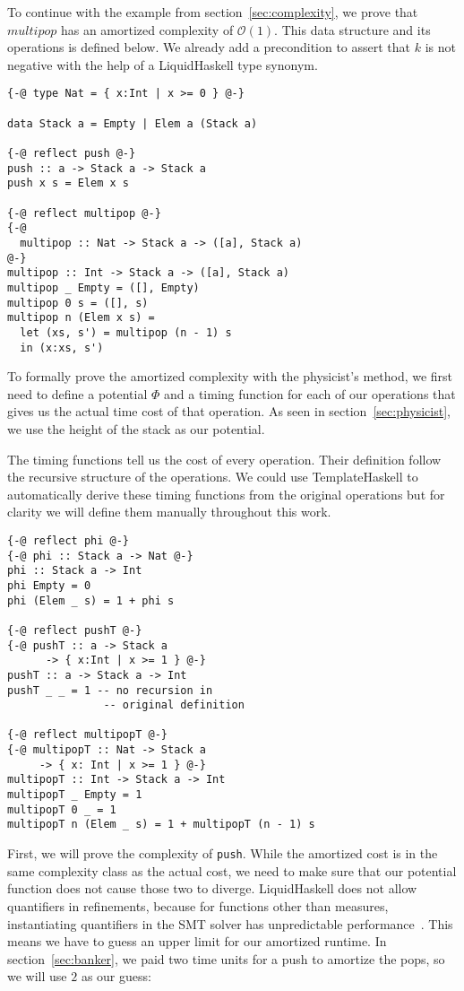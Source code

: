 \documentclass[sigplan,screen,review,anonymous]{acmart}
\renewcommand\O[1]{$\mathcal{O}(#1)$}
\begin{document}
To continue with the example from section~\ref{sec:complexity}, we prove that $multipop$ has an amortized complexity of \O{1}. This data structure and its operations is defined below. We already add a precondition to assert that $k$ is not negative with the help of a LiquidHaskell type synonym.

\begin{lstlisting}
{-@ type Nat = { x:Int | x >= 0 } @-}

data Stack a = Empty | Elem a (Stack a)

{-@ reflect push @-}
push :: a -> Stack a -> Stack a
push x s = Elem x s

{-@ reflect multipop @-}
{-@
  multipop :: Nat -> Stack a -> ([a], Stack a)
@-}
multipop :: Int -> Stack a -> ([a], Stack a)
multipop _ Empty = ([], Empty)
multipop 0 s = ([], s)
multipop n (Elem x s) =
  let (xs, s') = multipop (n - 1) s
  in (x:xs, s')
\end{lstlisting}

To formally prove the amortized complexity with the physicist's method, we first need to define a potential $\Phi$ and a timing function for each of our operations that gives us the actual time cost of that operation. As seen in section~\ref{sec:physicist}, we use the height of the stack as our potential. 

The timing functions tell us the cost of every operation. Their definition follow the recursive structure of the operations. We could use TemplateHaskell to automatically derive these timing functions from the original operations but for clarity we will define them manually throughout this work.

\begin{lstlisting}
{-@ reflect phi @-}
{-@ phi :: Stack a -> Nat @-}
phi :: Stack a -> Int
phi Empty = 0
phi (Elem _ s) = 1 + phi s

{-@ reflect pushT @-}
{-@ pushT :: a -> Stack a
      -> { x:Int | x >= 1 } @-}
pushT :: a -> Stack a -> Int
pushT _ _ = 1 -- no recursion in
               -- original definition

{-@ reflect multipopT @-}
{-@ multipopT :: Nat -> Stack a
     -> { x: Int | x >= 1 } @-}
multipopT :: Int -> Stack a -> Int
multipopT _ Empty = 1
multipopT 0 _ = 1
multipopT n (Elem _ s) = 1 + multipopT (n - 1) s
\end{lstlisting}

First, we will prove the complexity of \texttt{push}. While the amortized cost is in the same complexity class as the actual cost, we need to make sure that our potential function does not cause those two to diverge. LiquidHaskell does not allow quantifiers in refinements, because for functions other than measures, instantiating quantifiers in the SMT solver has unpredictable performance~\cite{lh_quantifiers}. This means we have to guess an upper limit for our amortized runtime. In section~\ref{sec:banker}, we paid two time units for a push to amortize the pops, so we will use $2$ as our guess:
\end{document}
